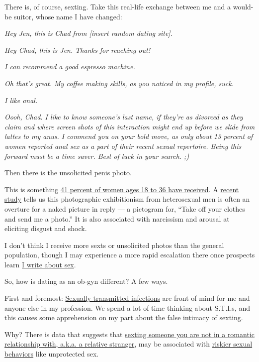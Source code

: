 There is, of course, sexting. Take this real-life exchange between me
and a would-be suitor, whose name I have changed:

\emph{Hey Jen, this is} \emph{Chad} \emph{from {[}insert random dating
site{]}.}

\emph{Hey Chad, this is Jen. Thanks for reaching out!}

\emph{I can recommend a good espresso machine.}

\emph{Oh that's great. My coffee making skills, as you noticed in my
profile, suck.}

\emph{I like anal.}

\emph{Oooh, Chad. I like to know someone's last name, if they're as
divorced as they claim and where screen shots of this interaction might
end up before we slide from lattes to my anus. I commend you on your
bold move, as only about} \emph{13 percent} \emph{of women reported anal
sex as a part of their recent sexual repertoire. Being this forward must
be a time saver. Best of luck in your search. ;)}

Then there is the unsolicited penis photo.

This is something
\href{https://yougov.co.uk/topics/politics/articles-reports/2018/02/16/four-ten-female-millennials-been-sent-dick-pic}{41
percent of women ages 18 to 36 have received}. A
\href{https://www.tandfonline.com/doi/full/10.1080/00224499.2019.1639036}{recent
study} tells us this photographic exhibitionism from heterosexual men is
often an overture for a naked picture in reply --- a pictogram for,
``Take off your clothes and send me a photo.'' It is also associated
with narcissism and arousal at eliciting disgust and shock.

I don't think I receive more sexts or unsolicited photos than the
general population, though I may experience a more rapid escalation
there once prospects learn
\href{https://www.nytimes3xbfgragh.onion/column/the-cycle}{I write about
sex}.

So, how is dating as an ob-gyn different? A few ways.

First and foremost:
\href{https://www.nytimes3xbfgragh.onion/2019/08/13/style/sti-stigma-sexual-transmitted-infections.html}{Sexually
transmitted infections} are front of mind for me and anyone else in my
profession. We spend a lot of time thinking about S.T.I.s, and this
causes some apprehension on my part about the false intimacy of sexting.

Why? There is data that suggests that
\href{https://link.springer.com/article/10.1007\%2Fs10508-019-01497-w}{sexting
someone you are not in a romantic relationship with, a.k.a. a relative
stranger}, may be associated with
\href{https://guilfordjournals.com/doi/pdf/10.1521/aeap.2016.28.2.138}{riskier
sexual behaviors} like unprotected sex.

